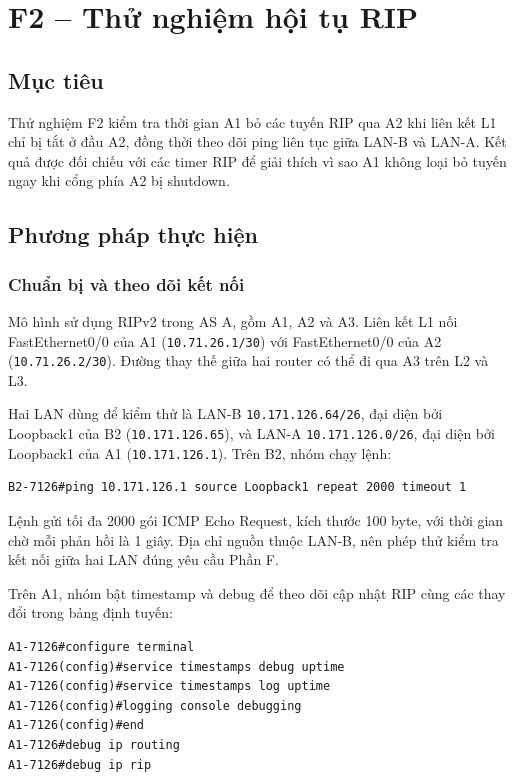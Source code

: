 
\section{F2 -- Thử nghiệm hội tụ RIP}
\label{sec:F2}

\subsection{Mục tiêu}

Thử nghiệm F2 kiểm tra thời gian A1 bỏ các tuyến RIP qua A2
khi liên kết L1 chỉ bị tắt ở đầu A2, đồng thời theo dõi ping
liên tục giữa LAN-B và LAN-A. Kết quả được đối chiếu với
các timer RIP để giải thích vì sao A1 không loại bỏ tuyến ngay
khi cổng phía A2 bị shutdown.

\subsection{Phương pháp thực hiện}

\subsubsection{Chuẩn bị và theo dõi kết nối}

Mô hình sử dụng RIPv2 trong AS A, gồm A1, A2 và A3.
Liên kết L1 nối FastEthernet0/0 của A1
(\texttt{10.71.26.1/30}) với FastEthernet0/0 của A2
(\texttt{10.71.26.2/30}). Đường thay thế giữa hai router
có thể đi qua A3 trên L2 và L3.

Hai LAN dùng để kiểm thử là LAN-B
\texttt{10.171.126.64/26}, đại diện bởi Loopback1 của B2
(\texttt{10.171.126.65}), và LAN-A
\texttt{10.171.126.0/26}, đại diện bởi Loopback1 của A1
(\texttt{10.171.126.1}). Trên B2, nhóm chạy lệnh:

\begin{lstlisting}
B2-7126#ping 10.171.126.1 source Loopback1 repeat 2000 timeout 1
\end{lstlisting}

Lệnh gửi tối đa 2000 gói ICMP Echo Request, kích thước
100 byte, với thời gian chờ mỗi phản hồi là 1 giây.
Địa chỉ nguồn thuộc LAN-B, nên phép thử kiểm tra kết nối
giữa hai LAN đúng yêu cầu Phần F.

Trên A1, nhóm bật timestamp và debug để theo dõi cập nhật RIP
cùng các thay đổi trong bảng định tuyến:

\begin{lstlisting}
A1-7126#configure terminal
A1-7126(config)#service timestamps debug uptime
A1-7126(config)#service timestamps log uptime
A1-7126(config)#logging console debugging
A1-7126(config)#end
A1-7126#debug ip routing
A1-7126#debug ip rip
\end{lstlisting}

